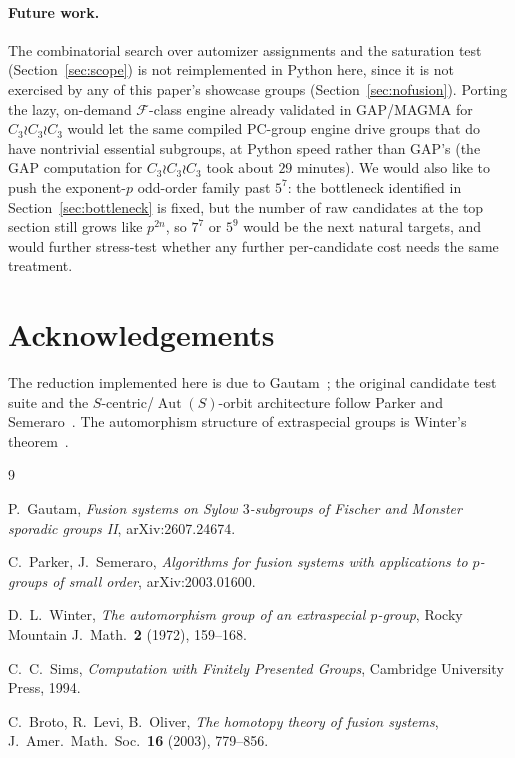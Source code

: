 \documentclass[11pt]{article}
\theoremstyle{remark}
\begin{document}
\paragraph{Future work.} The combinatorial search over automizer
assignments and the saturation test (Section~\ref{sec:scope}) is not
reimplemented in Python here, since it is not exercised by any of this
paper's showcase groups (Section~\ref{sec:nofusion}). Porting the
lazy, on-demand $\mathcal{F}$-class engine already validated in GAP/MAGMA
for $C_3 \wr C_3 \wr C_3$ would let the same compiled PC-group engine drive
groups that do have nontrivial essential subgroups, at Python speed rather
than GAP's (the GAP computation for $C_3 \wr C_3 \wr C_3$ took about
$29$ minutes). We would also like to push the exponent-$p$ odd-order
family past $5^7$: the bottleneck identified in Section~\ref{sec:bottleneck}
is fixed, but the number of raw candidates at the top section still grows
like $p^{2n}$, so $7^7$ or $5^9$ would be the next natural targets, and
would further stress-test whether any further per-candidate cost needs the
same treatment.

\section*{Acknowledgements}

The reduction implemented here is due to Gautam~\cite{gautam2024}; the
original candidate test suite and the $S$-centric/$\operatorname{Aut}(S)$-orbit
architecture follow Parker and Semeraro~\cite{parkersemeraro}. The
automorphism structure of extraspecial groups is Winter's
theorem~\cite{winter1972}.

\begin{thebibliography}{9}

P.~Gautam, \emph{Fusion systems on Sylow $3$-subgroups of Fischer and
  Monster sporadic groups II}, arXiv:2607.24674.

C.~Parker, J.~Semeraro, \emph{Algorithms for fusion systems with
  applications to $p$-groups of small order}, arXiv:2003.01600.

D.~L.~Winter, \emph{The automorphism group of an extraspecial $p$-group},
  Rocky Mountain J.\ Math.\ \textbf{2} (1972), 159--168.

C.~C.~Sims, \emph{Computation with Finitely Presented Groups}, Cambridge
  University Press, 1994.

C.~Broto, R.~Levi, B.~Oliver, \emph{The homotopy theory of fusion systems},
  J.\ Amer.\ Math.\ Soc.\ \textbf{16} (2003), 779--856.

\end{thebibliography}
\end{document}
